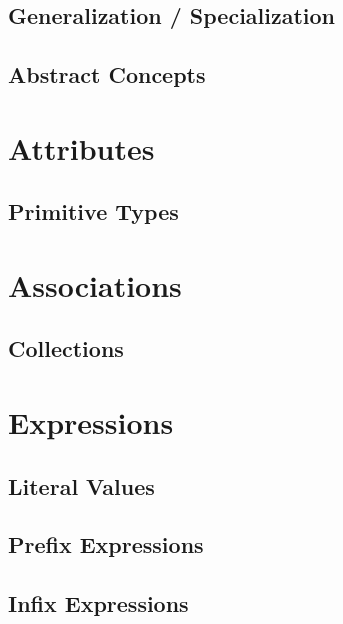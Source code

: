 \documentclass[a4paper,oneside,12pt, extrafontsizes]{memoir}
\theoremstyle{definition}
\theoremstyle{definition}
\theoremstyle{definition}
\theoremstyle{definition}
\theoremstyle{definition}
\begin{document}
\section{Generalization / Specialization}
\label{sec:generalization}


\section{Abstract Concepts}
\label{sec:abstract}


\chapter{Attributes}
\label{ch:attributes}


\section{Primitive Types}
\label{sec:primitive-types}

\chapter{Associations}
\label{ch:associations}


\section{Collections}
\label{sec:collections}

\chapter{Expressions}
\label{ch:expressions}


\section{Literal Values}
\label{sec:literals}


\section{Prefix Expressions}
\label{sec:prefix}


\section{Infix Expressions}
\label{sec:infix}

\end{document}

